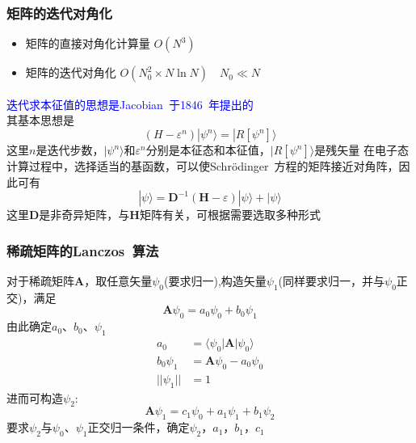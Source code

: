 \documentclass[cjk,slidestop,compress,mathserif,blue]{beamer}
\newcommand{\upcite}[1]{\hspace{0ex}\textsuperscript{\cite{#1}}} %
\begin{document}
\frame
{
	\frametitle{矩阵的迭代对角化}
	\begin{itemize}
		\item 矩阵的直接对角化计算量 $O(N^3)$
		\item 矩阵的迭代对角化 $O(N_0^2\times N\ln N)\quad N_0\ll N$
	\end{itemize}
	\textcolor{blue}{迭代求本征值的思想是\textrm{Jacobian~}于\textrm{1846~}年提出的}\upcite{Crelle30-51_1846}\\
	其基本思想是
	\begin{displaymath}
		(H-\varepsilon^n)|\psi^n\rangle=|R[\psi^n]\rangle
	\end{displaymath}
	这里$n$是迭代步数，$|\psi^n\rangle$和$\varepsilon^n$分别是本征态和本征值，$|R[\psi^n]\rangle$是残矢量
	\vskip 10pt
	在电子态计算过程中，选择适当的基函数，可以使\textrm{Schr\"odinger~}方程的矩阵接近对角阵，因此可有
	\begin{displaymath}
		|\psi\rangle=\mathbf{D}^{-1}(\mathbf{H}-\varepsilon)|\psi\rangle+|\psi\rangle
	\end{displaymath}
	这里$\mathbf{D}$是非奇异矩阵，与$\mathbf{H}$矩阵有关，可根据需要选取多种形式
}

\frame
{
	\frametitle{稀疏矩阵的\textrm{Lanczos~}算法}
	对于稀疏矩阵$\mathbf{A}$，取任意矢量$\psi_0$(要求归一),构造矢量$\psi_1$(同样要求归一，并与$\psi_0$正交)，满足
	\begin{displaymath}
		\mathbf{A}\psi_0=a_0\psi_0+b_0\psi_1
	\end{displaymath}
	由此确定$a_0$、$b_0$、$\psi_1$
	\begin{displaymath}
		\begin{aligned}
			a_0&=\langle\psi_0|\mathbf{A}|\psi_0\rangle\\
			b_0\psi_1&=\mathbf{A}\psi_0-a_0\psi_0\\
			||\psi_1||&=1
		\end{aligned}
	\end{displaymath}
	进而可构造$\psi_2$:
	\begin{displaymath}
		\mathbf{A}\psi_1=c_1\psi_0+a_1\psi_1+b_1\psi_2
	\end{displaymath}
	要求$\psi_2$与$\psi_0$、$\psi_1$正交归一条件，确定$\psi_2$，$a_1$，$b_1$，$c_1$
}
\end{document}
